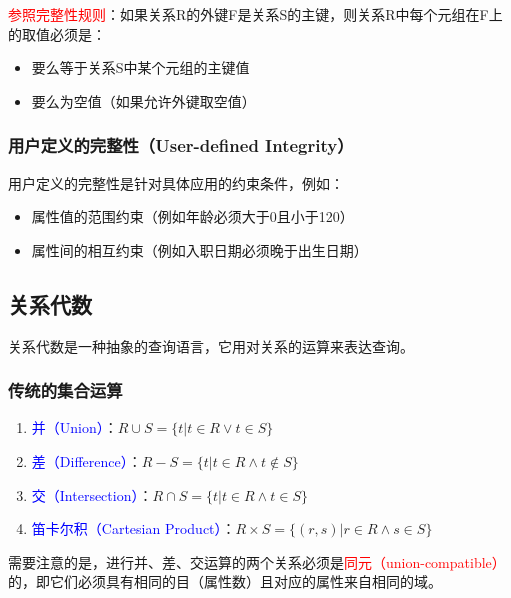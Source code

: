 \documentclass{../../note}
\begin{document}
\textcolor{red}{参照完整性规则}：如果关系R的外键F是关系S的主键，则关系R中每个元组在F上的取值必须是：
\begin{itemize}
  \item 要么等于关系S中某个元组的主键值
  \item 要么为空值（如果允许外键取空值）
\end{itemize}

\subsubsection{用户定义的完整性（User-defined Integrity）}

用户定义的完整性是针对具体应用的约束条件，例如：
\begin{itemize}
  \item 属性值的范围约束（例如年龄必须大于0且小于120）
  \item 属性间的相互约束（例如入职日期必须晚于出生日期）
\end{itemize}

\subsection{关系代数}

关系代数是一种抽象的查询语言，它用对关系的运算来表达查询。

\subsubsection{传统的集合运算}

\begin{enumerate}
  \item \textcolor{blue}{并（Union）}：$R \cup S = \{t | t \in R \vee t \in S\}$

  \item \textcolor{blue}{差（Difference）}：$R - S = \{t | t \in R \wedge t \notin S\}$

  \item \textcolor{blue}{交（Intersection）}：$R \cap S = \{t | t \in R \wedge t \in S\}$

  \item \textcolor{blue}{笛卡尔积（Cartesian Product）}：$R \times S = \{(r, s) | r \in R \wedge s \in S\}$
\end{enumerate}

需要注意的是，进行并、差、交运算的两个关系必须是\textcolor{red}{同元（union-compatible）}的，即它们必须具有相同的目（属性数）且对应的属性来自相同的域。
\end{document}
